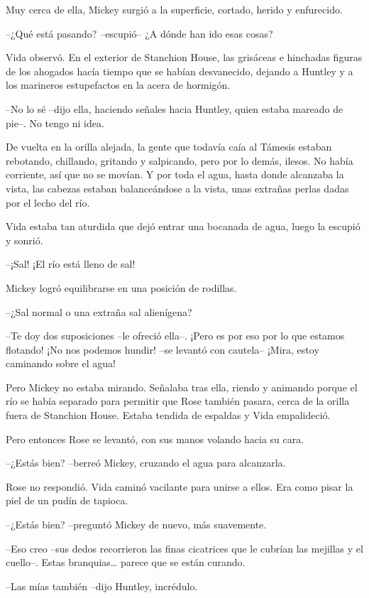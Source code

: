{Muy cerca de ella, Mickey surgió a la superficie, cortado, herido y
enfurecido.}

{--¿Qué está pasando? --escupió-- ¿A dónde han ido esas cosas?}

{Vida observó. En el exterior de Stanchion House, las grisáceas e
 hinchadas figuras de los ahogados hacía tiempo que se habían
 desvanecido, dejando a Huntley y a los marineros estupefactos en la
acera de hormigón.}

{--No lo sé --dijo ella, haciendo señales hacia Huntley, quien estaba
mareado de pie--. No tengo ni idea.}

{De vuelta en la orilla alejada, la gente que todavía caía al Támesis
 estaban rebotando, chillando, gritando y salpicando, pero por lo demás,
 ilesos. No había corriente, así que no se movían. Y por toda el agua,
 hasta donde alcanzaba la vista, las cabezas estaban balanceándose a la
vista, unas extrañas perlas dadas por el lecho del río.}

{Vida estaba tan aturdida que dejó entrar una bocanada de agua, luego la
escupió y sonrió.}

{--¡Sal! ¡El río está lleno de sal!}

{Mickey logró equilibrarse en una posición de rodillas.}

{--¿Sal normal o una extraña sal alienígena?}

{--Te doy dos suposiciones --le ofreció ella--. ¡Pero es por eso por lo
 que estamos flotando! ¡No nos podemos hundir! --se levantó con cautela--
¡Mira, estoy caminando sobre el agua!}

{Pero Mickey no estaba mirando. Señalaba tras ella, riendo y animando
 porque el río se había separado para permitir que Rose también pasara,
 cerca de la orilla fuera de Stanchion House. Estaba tendida de espaldas
y Vida empalideció.}

{Pero entonces Rose se levantó, con sus manos volando hacia su cara.}

{--¿Estás bien? --berreó Mickey, cruzando el agua para alcanzarla.}

{Rose no respondió. Vida caminó vacilante para unirse a ellos. Era como
pisar la piel de un pudín de tapioca.}

{--¿Estás bien? --preguntó Mickey de nuevo, más suavemente.}

{--Eso creo --sus dedos recorrieron las finas cicatrices que le cubrían
 las mejillas y el cuello--. Estas branquias\ldots{} parece que se están
curando.}

{--Las mías también --dijo Huntley, incrédulo.}

